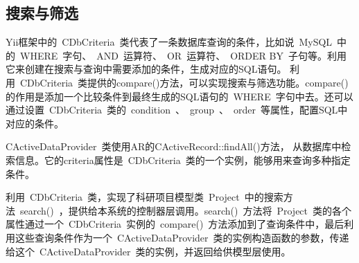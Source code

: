 \subsection{搜索与筛选}
\label{methodsearch}
Yii框架中的~CDbCriteria~类代表了一条数据库查询的条件，比如说~MySQL~中的~WHERE~字句、~AND~运算符、~OR~运算符、~ORDER BY~子句等。利用它来创建在搜索与查询中需要添加的条件，生成对应的SQL语句。
利用~CDbCriteria~类提供的compare()方法，可以实现搜索与筛选功能。compare()的作用是添加一个比较条件到最终生成的SQL语句的~WHERE~字句中去。还可以通过设置~CDbCriteria~类的~condition~、~group~、~order~等属性，配置SQL中对应的条件。

CActiveDataProvider~类使用AR的CActiveRecord::findAll()方法， 从数据库中检索信息。它的criteria属性是~CDbCriteria~类的一个实例，能够用来查询多种指定条件。

利用~CDbCriteria~类，实现了科研项目模型类~Project~中的搜索方法~search()~，提供给本系统的控制器层调用。search()~方法将~Project~类的各个属性通过一个~CDbCriteria~实例的~compare()~方法添加到了查询条件中，最后利用这些查询条件作为一个~CActiveDataProvider~类的实例构造函数的参数，传递给这个~CActiveDataProvider~类的实例，并返回给供模型层使用。



